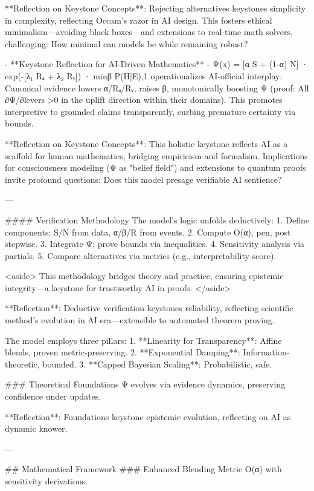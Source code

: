 **Reflection on Keystone Concepts**: Rejecting alternatives keystones simplicity in complexity, reflecting Occam's razor in AI design. This fosters ethical minimalism—avoiding black boxes—and extensions to real-time math solvers, challenging: How minimal can models be while remaining robust?

- **Keystone Reflection for AI-Driven Mathematics**
  - Ψ(x) = [α S + (1-α) N] · exp(-[λ₁ Rₐ + λ₂ Rᵥ]) · min{β P(H|E),1} operationalizes AI-official interplay: Canonical evidence lowers α/Rₐ/Rᵥ, raises β, monotonically boosting Ψ (proof: All ∂Ψ/∂levers >0 in the uplift direction within their domains). This promotes interpretive to grounded claims transparently, curbing premature certainty via bounds.

**Reflection on Keystone Concepts**: This holistic keystone reflects AI as a scaffold for human mathematics, bridging empiricism and formalism. Implications for consciousness modeling (Ψ as "belief field") and extensions to quantum proofs invite profound questions: Does this model presage verifiable AI sentience?

---

#### Verification Methodology
The model's logic unfolds deductively:
1. Define components: S/N from data, α/β/R from events.
2. Compute O(α), pen, post stepwise.
3. Integrate Ψ; prove bounds via inequalities.
4. Sensitivity analysis via partials.
5. Compare alternatives via metrics (e.g., interpretability score).

<aside>
This methodology bridges theory and practice, ensuring epistemic integrity—a keystone for trustworthy AI in proofs.
</aside>

**Reflection**: Deductive verification keystones reliability, reflecting scientific method's evolution in AI era—extensible to automated theorem proving.

The model employs three pillars:
1. **Linearity for Transparency**: Affine blends, proven metric-preserving.
2. **Exponential Damping**: Information-theoretic, bounded.
3. **Capped Bayesian Scaling**: Probabilistic, safe.

### Theoretical Foundations
Ψ evolves via evidence dynamics, preserving confidence under updates.

**Reflection**: Foundations keystone epistemic evolution, reflecting on AI as dynamic knower.

---

## Mathematical Framework
### Enhanced Blending Metric
O(α) with sensitivity derivations.

